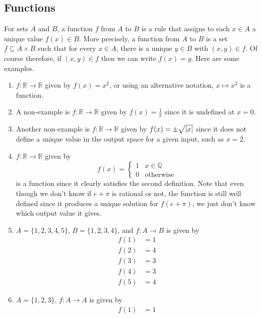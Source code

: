 \subsection{Functions}
For sets \(A\) and \(B\), a function \(f\) from \(A\) to \(B\) is a rule that assigns to each \(x \in A\) a unique value \(f(x) \in B\).
More precisely, a function from \(A\) to \(B\) is a set \(f \subseteq A \times B\) such that for every \(x \in A\), there is a unique \(y \in B\) with \((x, y) \in f\).
Of course therefore, if \((x, y) \in f\) then we can write \(f(x) = y\).
Here are some examples.
\begin{enumerate}
	\item \(f\colon \mathbb R \to \mathbb R\) given by \(f(x) = x^2\), or using an alternative notation, \(x \mapsto x^2\) is a function.
	\item A non-example is \(f\colon \mathbb R \to \mathbb R\) given by \(f(x) = \frac{1}{x}\) since it is undefined at \(x=0\).
	\item Another non-example is \(f\colon \mathbb R \to \mathbb R\) given by \(f(x) = \pm \sqrt{\abs{x}}\) since it does not define a unique value in the output space for a given input, such as \(x=2\).
	\item \(f\colon \mathbb R \to \mathbb R\) given by
	      \[
		      f(x) = \begin{cases}
			      1 & x \in \mathbb Q  \\
			      0 & \text{otherwise}
		      \end{cases}
	      \]
	      is a function since it clearly satisfies the second definition.
	      Note that even though we don't know if \(e + \pi\) is rational or not, the function is still well defined since it produces a unique solution for \(f(e + \pi)\), we just don't know which output value it gives.
	\item \(A = \{ 1, 2, 3, 4, 5 \}\), \(B = \{ 1, 2, 3, 4 \}\), and \(f\colon A \to B\) is given by
	      \begin{align*}
		      f(1) & = 1 \\
		      f(2) & = 4 \\
		      f(3) & = 3 \\
		      f(4) & = 3 \\
		      f(5) & = 4
	      \end{align*}
	\item \(A = \{ 1, 2, 3 \}\), \(f\colon A \to A\) is given by
	      \begin{align*}
		      f(1) & = 1 \\

\end{align*}
\end{enumerate}
